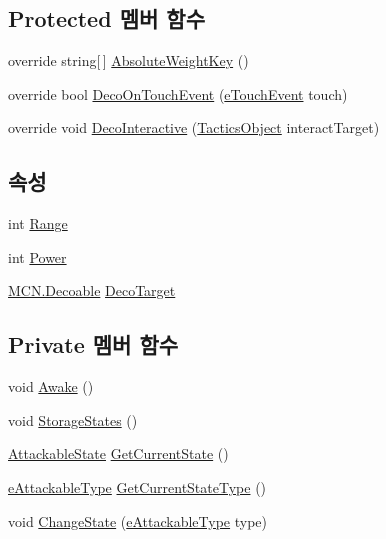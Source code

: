 \subsection*{Protected 멤버 함수}
\begin{DoxyCompactItemize}
\item 
override string\mbox{[}$\,$\mbox{]} \hyperlink{class_attack_decorator_aa0fdb6701a08f63d011aacf6bd6d6df7}{Absolute\+Weight\+Key} ()
\item 
override bool \hyperlink{class_attack_decorator_abff1ff6a1fa1b896f3f0251cf7652eb0}{Deco\+On\+Touch\+Event} (\hyperlink{_touch_manager_8cs_ae33e321a424fe84ba8b2fdb81ad40a68}{e\+Touch\+Event} touch)
\item 
override void \hyperlink{class_attack_decorator_ac0de076a7e28dbb6253aa5b1555195b3}{Deco\+Interactive} (\hyperlink{class_tactics_object}{Tactics\+Object} interact\+Target)
\end{DoxyCompactItemize}
\subsection*{속성}
\begin{DoxyCompactItemize}
\item 
int \hyperlink{class_attack_decorator_ad025c4d20cc5dba4326ecbd52562a3c4}{Range}
\item 
int \hyperlink{class_attack_decorator_a3305d359c9c0faaf4f12aa261492ee7c}{Power}
\item 
\hyperlink{class_m_c_n_1_1_decoable}{M\+C\+N.\+Decoable} \hyperlink{class_m_c_n_1_1_decorator_a1306a0a8b814650cd5970a1ffc7ba2fe}{Deco\+Target}
\end{DoxyCompactItemize}
\subsection*{Private 멤버 함수}
\begin{DoxyCompactItemize}
\item 
void \hyperlink{class_attack_decorator_a84bd4b501002dde5aaf3bedad223acad}{Awake} ()
\item 
void \hyperlink{class_attack_decorator_a4c5bb156eda734c19594c740c6d63aad}{Storage\+States} ()
\item 
\hyperlink{class_attack_decorator_1_1_attackable_state}{Attackable\+State} \hyperlink{class_attack_decorator_af56bf418b8ba41fa9c7d8a697e39ce26}{Get\+Current\+State} ()
\item 
\hyperlink{_attack_decorator_8cs_a11dd66d5fec1bd5b34c8ca6934344cad}{e\+Attackable\+Type} \hyperlink{class_attack_decorator_a0fe90a081a8bf36c973b6a9b571c4966}{Get\+Current\+State\+Type} ()
\item 
void \hyperlink{class_attack_decorator_a754ed58a005e35f352b5eef1a9de46b2}{Change\+State} (\hyperlink{_attack_decorator_8cs_a11dd66d5fec1bd5b34c8ca6934344cad}{e\+Attackable\+Type} type)
\end{DoxyCompactItemize}
